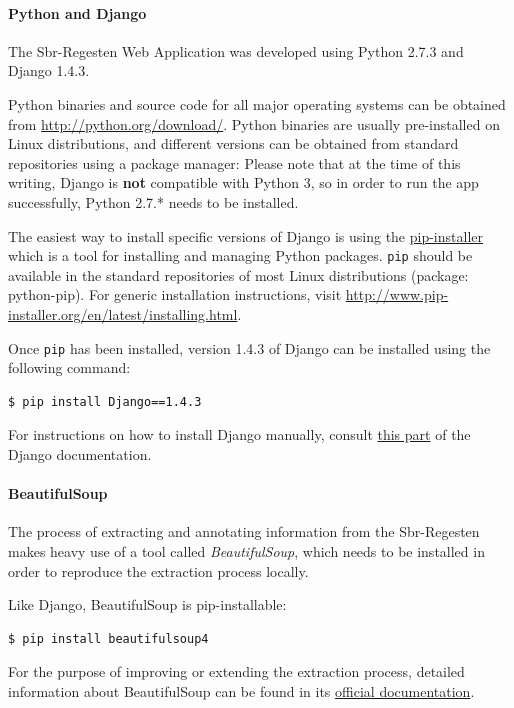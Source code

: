 \paragraph{Python and Django}
The Sbr-Regesten Web Application was developed using Python 2.7.3 and
Django 1.4.3.

Python binaries and source code for all major operating systems can be
obtained from \url{http://python.org/download/}. Python binaries are
usually pre-installed on Linux distributions, and different versions
can be obtained from standard repositories using a package manager:
Please note that at the time of this writing, Django is \textbf{not}
compatible with Python 3, so in order to run the app successfully,
Python 2.7.* needs to be installed.

The easiest way to install specific versions of Django is using the
\href{http://www.pip-installer.org/en/latest/}{pip-installer} which is
a tool for installing and managing Python packages. \texttt{pip}
should be available in the standard repositories of most Linux
distributions (package: python-pip). For generic installation
instructions, visit
\url{http://www.pip-installer.org/en/latest/installing.html}.

Once \texttt{pip} has been installed, version 1.4.3 of Django can be
installed using the following command:

\begin{verbatim}
$ pip install Django==1.4.3
\end{verbatim}

For instructions on how to install Django manually, consult
\href{https://www.djangoproject.com/download/}{this part} of the
Django documentation.

\paragraph{BeautifulSoup}
The process of extracting and annotating information from the
Sbr-Regesten makes heavy use of a tool called \emph{BeautifulSoup},
which needs to be installed in order to reproduce the extraction
process locally.

Like Django, BeautifulSoup is pip-installable:

\begin{verbatim}
$ pip install beautifulsoup4
\end{verbatim}

For the purpose of improving or extending the extraction process,
detailed information about BeautifulSoup can be found in its
\href{http://www.crummy.com/software/BeautifulSoup/bs4/doc/}{official documentation}.

